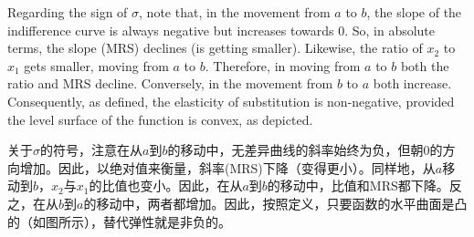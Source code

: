 \begin{original}
Regarding the sign of $\sigma$, note that, in the movement from $a$ to $b$, the slope of the indifference curve is always negative but increases towards 0. So, in absolute terms, the slope (MRS) declines (is getting smaller). Likewise, the ratio of $x_2$ to $x_1$ gets smaller, moving from $a$ to $b$. Therefore, in moving from $a$ to $b$ both the ratio and MRS decline. Conversely, in the movement from $b$ to $a$ both increase. Consequently, as defined, the elasticity of substitution is non-negative, provided the level surface of the function is convex, as depicted.
\end{original}
\begin{translation}
关于$\sigma$的符号，注意在从$a$到$b$的移动中，无差异曲线的斜率始终为负，但朝0的方向增加。因此，以绝对值来衡量，斜率(MRS)下降（变得更小）。同样地，从$a$移动到$b$，$x_2$与$x_1$的比值也变小。因此，在从$a$到$b$的移动中，比值和MRS都下降。反之，在从$b$到$a$的移动中，两者都增加。因此，按照定义，只要函数的水平曲面是凸的（如图所示），替代弹性就是非负的。
\end{translation}

